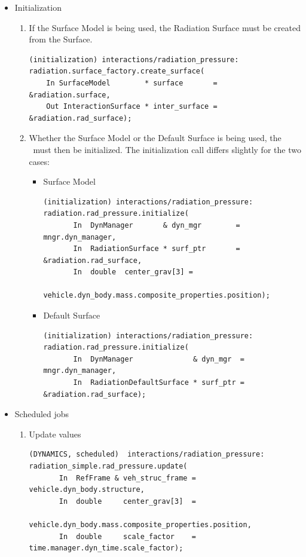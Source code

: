 \begin{enumerate}
\begin{itemize}
      \item {Initialization}
        \begin{enumerate}
          \item{} If the Surface Model is being used,
            the Radiation Surface must be created from the Surface.
\begin{verbatim}
(initialization) interactions/radiation_pressure:
radiation.surface_factory.create_surface(
    In SurfaceModel        * surface       =  &radiation.surface,
    Out InteractionSurface * inter_surface =  &radiation.rad_surface);
\end{verbatim}
          \item{} Whether the Surface Model or the Default Surface is being
            used, the \RadiationPressureDesc\ must then be initialized.
            The initialization call differs slightly for the two cases:
            \begin{itemize}
              \item{Surface Model}
\begin{verbatim}
(initialization) interactions/radiation_pressure:
radiation.rad_pressure.initialize(
       In  DynManager       & dyn_mgr        = mngr.dyn_manager,
       In  RadiationSurface * surf_ptr       = &radiation.rad_surface,
       In  double  center_grav[3] =
                      vehicle.dyn_body.mass.composite_properties.position);
\end{verbatim}
              \item{Default Surface}
\begin{verbatim}
(initialization) interactions/radiation_pressure:
radiation.rad_pressure.initialize(
       In  DynManager              & dyn_mgr  = mngr.dyn_manager,
       In  RadiationDefaultSurface * surf_ptr = &radiation.rad_surface);
\end{verbatim}
            \end{itemize}
        \end{enumerate}


      \item {Scheduled jobs}
        \begin{enumerate}
          \item {Update values}
\begin{verbatim}
(DYNAMICS, scheduled)  interactions/radiation_pressure:
radiation_simple.rad_pressure.update(
       In  RefFrame & veh_struc_frame = vehicle.dyn_body.structure,
       In  double     center_grav[3]  =
                             vehicle.dyn_body.mass.composite_properties.position,
       In  double     scale_factor    = time.manager.dyn_time.scale_factor);
\end{verbatim}


\end{enumerate}
\end{itemize}
\end{enumerate}
